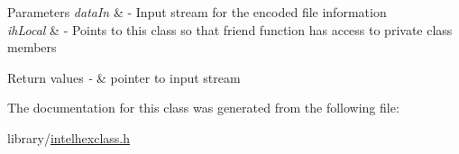 \begin{DoxyParams}{Parameters}
{\em data\-In} & -\/ Input stream for the encoded file information \\
\hline
{\em ih\-Local} & -\/ Points to this class so that friend function has access to private class members\\
\hline
\end{DoxyParams}

\begin{DoxyRetVals}{Return values}
{\em -\/} & pointer to input stream \\
\hline
\end{DoxyRetVals}


The documentation for this class was generated from the following file\-:\begin{DoxyCompactItemize}
\item 
library/\hyperlink{intelhexclass_8h}{intelhexclass.\-h}\end{DoxyCompactItemize}
